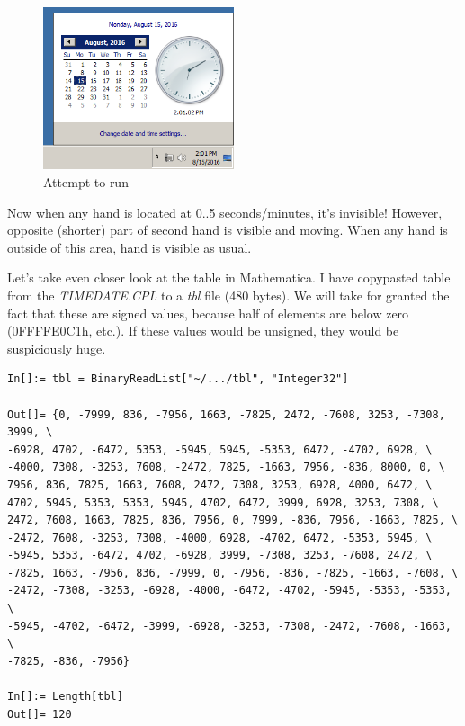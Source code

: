 \begin{figure}[H]
\centering
\includegraphics[width=0.5\textwidth]{examples/timedate/6_pairs_zeroed.png}
\caption{Attempt to run}
\end{figure}

Now when any hand is located at 0..5 seconds/minutes, it's invisible! However, opposite (shorter) part of second hand
is visible and moving.
When any hand is outside of this area, hand is visible as usual.

Let's take even closer look at the table in Mathematica.
I have copypasted table from the \emph{TIMEDATE.CPL} to a \emph{tbl} file (480 bytes).
We will take for granted the fact that these are signed values, because half of elements are below zero (0FFFFE0C1h, etc.).
If these values would be unsigned, they would be suspiciously huge.

\begin{lstlisting}[style=custommath]
In[]:= tbl = BinaryReadList["~/.../tbl", "Integer32"]

Out[]= {0, -7999, 836, -7956, 1663, -7825, 2472, -7608, 3253, -7308, 3999, \
-6928, 4702, -6472, 5353, -5945, 5945, -5353, 6472, -4702, 6928, \
-4000, 7308, -3253, 7608, -2472, 7825, -1663, 7956, -836, 8000, 0, \
7956, 836, 7825, 1663, 7608, 2472, 7308, 3253, 6928, 4000, 6472, \
4702, 5945, 5353, 5353, 5945, 4702, 6472, 3999, 6928, 3253, 7308, \
2472, 7608, 1663, 7825, 836, 7956, 0, 7999, -836, 7956, -1663, 7825, \
-2472, 7608, -3253, 7308, -4000, 6928, -4702, 6472, -5353, 5945, \
-5945, 5353, -6472, 4702, -6928, 3999, -7308, 3253, -7608, 2472, \
-7825, 1663, -7956, 836, -7999, 0, -7956, -836, -7825, -1663, -7608, \
-2472, -7308, -3253, -6928, -4000, -6472, -4702, -5945, -5353, -5353, \
-5945, -4702, -6472, -3999, -6928, -3253, -7308, -2472, -7608, -1663, \
-7825, -836, -7956}

In[]:= Length[tbl]
Out[]= 120
\end{lstlisting}

